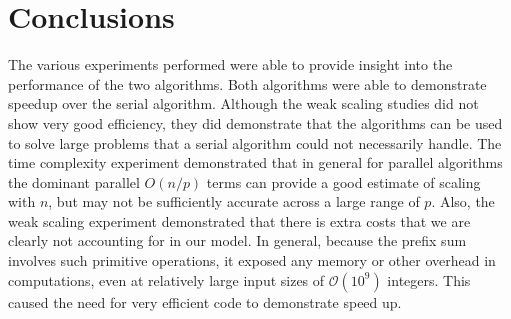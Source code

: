 \documentclass[12pt]{article}
\begin{document}
{{{{%

\section{Conclusions}

The various experiments performed were able to provide insight into the performance
of the two algorithms.  Both algorithms were able to demonstrate speedup
over the serial algorithm.  Although the weak scaling studies did not show very good efficiency,
they did demonstrate that the algorithms can be used to solve large problems that a
serial algorithm could not necessarily handle.  The time complexity experiment
demonstrated that in general for parallel algorithms the dominant parallel $O(n/p)$
terms can provide a good estimate of scaling with $n$, but may not be sufficiently
accurate across a large range of $p$. Also, the weak scaling experiment demonstrated that there is extra costs that we are
clearly not accounting for in our model. In general, because the prefix sum involves such primitive operations, it exposed any memory or
other overhead in computations, even at relatively large input sizes of
$\mathcal{O}(10^9)$ integers.  This caused the need for very efficient code to demonstrate speed
up. 

}}}}
\end{document}
